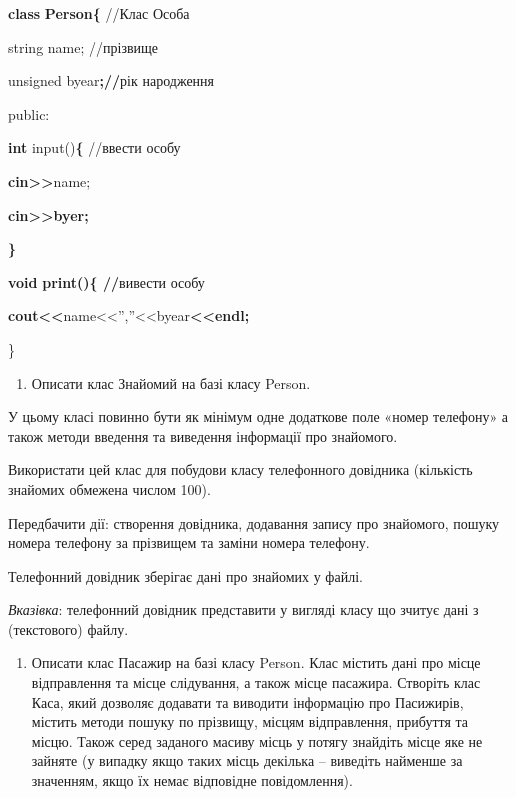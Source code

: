 \documentclass[]{article}
\begin{document}
\textbf{class} \textbf{Person\{} //Клас Особа

string name; //прізвище

unsigned byear\textbf{;//}рік народження

public:

\textbf{int} input()\textbf{\{} //ввести особу

\textbf{cin\textgreater{}\textgreater{}}name;

\textbf{cin\textgreater{}\textgreater{}byer;}

\textbf{\}}

\textbf{void} \textbf{print()\{ //}вивести особу

\textbf{cout\textless{}\textless{}}name\textless{}\textless{}'',''\textless{}\textless{}byear\textbf{\textless{}\textless{}endl;}

\}

\begin{enumerate}
\def\labelenumi{\arabic{enumi})}
\item
  Описати клас Знайомий на базі класу Person.
\end{enumerate}

У цьому класі повинно бути як мінімум одне додаткове поле «номер
телефону» а також методи введення та виведення інформації про знайомого.

Використати цей клас для побудови класу телефонного довідника (кількість
знайомих обмежена числом 100).

Передбачити дії: створення довідника, додавання запису про знайомого,
пошуку номера телефону за прізвищем та заміни номера телефону.

Телефонний довідник зберігає дані про знайомих у файлі.

\emph{\emph{Вказівка}}: телефонний довідник представити у вигляді класу
що зчитує дані з (текстового) файлу.

\begin{enumerate}
\def\labelenumi{\arabic{enumi})}
\item
  Описати клас Пасажир на базі класу Person. Клас містить дані про місце
  відправлення та місце слідування, а також місце пасажира. Створіть
  клас Каса, який дозволяє додавати та виводити інформацію про
  Пасижирів, містить методи пошуку по прізвищу, місцям відправлення,
  прибуття та місцю. Також серед заданого масиву місць у потягу знайдіть
  місце яке не зайняте (у випадку якщо таких місць декілька -- виведіть
  найменше за значенням, якщо їх немає відповідне повідомлення).
\end{enumerate}
\end{document}
